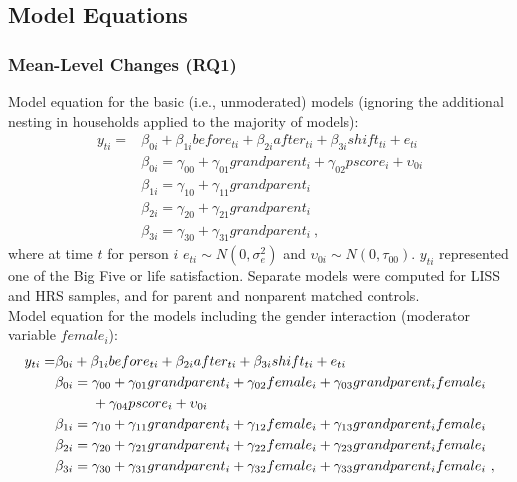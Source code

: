 \documentclass[
  english,
  man,floatsintext]{apa7}
\begin{document}
\renewcommand{\thefigure}{S\arabic{figure}} \setcounter{figure}{0}
\renewcommand{\thetable}{S\arabic{table}} \setcounter{table}{0}

\setcounter{page}{1}

\hypertarget{model-equations}{%
\subsection{Model Equations}\label{model-equations}}

\hypertarget{mean-level-changes-rq1}{%
\subsubsection{Mean-Level Changes (RQ1)}\label{mean-level-changes-rq1}}

Model equation for the basic (i.e., unmoderated) models (ignoring the additional nesting in households applied to the majority of models):
\begin{equation}
\begin{split}
y_{ti} =& \beta_{0i} + \beta_{1i}before_{ti} + \beta_{2i}after_{ti} + \beta_{3i}shift_{ti} + e_{ti} \\
 & \beta_{0i} = \gamma_{00} + \gamma_{01}grandparent_i + \gamma_{02}pscore_i + \upsilon_{0i} \\
 & \beta_{1i} = \gamma_{10} + \gamma_{11}grandparent_i \\
 & \beta_{2i} = \gamma_{20} + \gamma_{21}grandparent_i \\
 & \beta_{3i} = \gamma_{30} + \gamma_{31}grandparent_i\ ,
\end{split}
\label{eq:mlm1}
\end{equation}
where at time \(t\) for person \(i\) \(e_{ti} \sim N(0, \sigma_e^2)\) and \(\upsilon_{0i} \sim N(0, \tau_{00})\). \(y_{ti}\) represented one of the Big Five or life satisfaction. Separate models were computed for LISS and HRS samples, and for parent and nonparent matched controls.\\
Model equation for the models including the gender interaction (moderator variable \(female_i\)):
\begin{equation}
\begin{split}
y_{ti} =& \beta_{0i} + \beta_{1i}before_{ti} + \beta_{2i}after_{ti} + \beta_{3i}shift_{ti} + e_{ti} \\
 & \beta_{0i} = \gamma_{00} + \gamma_{01}grandparent_i + \gamma_{02}female_i + \gamma_{03}grandparent_{i}female_{i} \\
 & \hphantom{{}=\beta_{0i}}+ \gamma_{04}pscore_i + \upsilon_{0i} \\
 & \beta_{1i} = \gamma_{10} + \gamma_{11}grandparent_i + \gamma_{12}female_i + \gamma_{13}grandparent_{i}female_{i} \\
 & \beta_{2i} = \gamma_{20} + \gamma_{21}grandparent_i + \gamma_{22}female_i + \gamma_{23}grandparent_{i}female_{i} \\
 & \beta_{3i} = \gamma_{30} + \gamma_{31}grandparent_i + \gamma_{32}female_i + \gamma_{33}grandparent_{i}female_{i}\ ,
\end{split}
  \label{eq:mlm2}
\end{equation}
\end{document}
